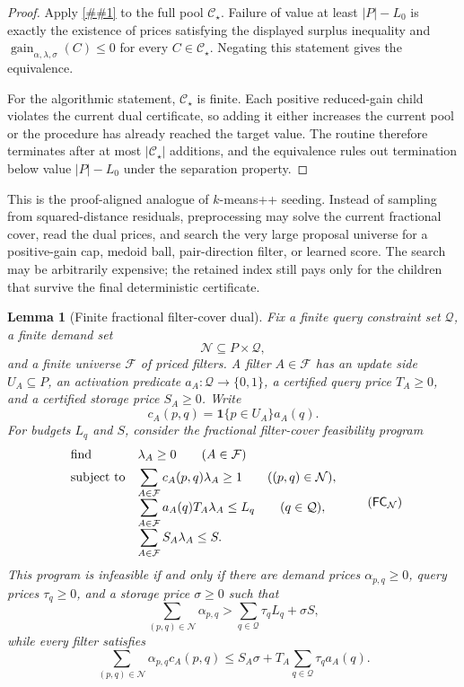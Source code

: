 \documentclass[10pt]{article}
\newcommand{\cref}[1]{\ref{##1}}
\newtheorem{lemma}[theorem]{Lemma}
\theoremstyle{definition}
\begin{document}
\begin{proof}
   Apply \cref{lem:finite-pool-dual} to the full pool
   $\mathcal C_\star$.  Failure of value at least $|P|-L_0$ is exactly the
   existence of prices satisfying the displayed surplus inequality and
   \(\operatorname{gain}_{\alpha,\lambda,\sigma}(C)\le0\) for every
   $C\in\mathcal C_\star$.  Negating this statement gives the equivalence.

   For the algorithmic statement, $\mathcal C_\star$ is finite.  Each positive
   reduced-gain child violates the current dual certificate, so adding it either
   increases the current pool or the procedure has already reached the target
   value.  The routine therefore terminates after at most $|\mathcal C_\star|$
   additions, and the equivalence rules out termination below value
   $|P|-L_0$ under the separation property.
\end{proof}

This is the proof-aligned analogue of $k$-means++ seeding.  Instead of sampling
from squared-distance residuals, preprocessing may solve the current fractional
cover, read the dual prices, and search the very large proposal universe for a
positive-gain cap, medoid ball, pair-direction filter, or learned score.  The
search may be arbitrarily expensive; the retained index still pays only for the
children that survive the final deterministic certificate.

\begin{lemma}[Finite fractional filter-cover dual]
   \label{lem:finite-filter-cover-dual}
   Fix a finite query constraint set $\mathcal Q$, a finite demand set
   \[
      \mathcal N\subseteq P\times\mathcal Q,
   \]
   and a finite universe $\mathcal F$ of priced filters.  A filter
   $A\in\mathcal F$ has an update side $U_A\subseteq P$, an activation predicate
   $a_A:\mathcal Q\to\{0,1\}$, a certified query price $T_A\ge0$, and a
   certified storage price $S_A\ge0$.  Write
   \[
      c_A(p,q)=\mathbf 1\{p\in U_A\}a_A(q).
   \]
   For budgets $L_q$ and $S$, consider the fractional filter-cover feasibility
   program
   \[
   \begin{array}{ll}
   \text{\rm find} & \lambda_A\ge0 \qquad(A\in\mathcal F)\\[0.4em]
   \text{\rm subject to}
      & \displaystyle
        \sum_{A\in\mathcal F}c_A(p,q)\lambda_A\ge1
        \qquad ((p,q)\in\mathcal N),\\[0.8em]
      & \displaystyle
        \sum_{A\in\mathcal F}a_A(q)T_A\lambda_A\le L_q
        \qquad(q\in\mathcal Q),\\[0.8em]
      & \displaystyle
        \sum_{A\in\mathcal F}S_A\lambda_A\le S .
   \end{array}
   \tag{$\mathsf{FC}_{\mathcal N}$}
   \]
   This program is infeasible if and only if there are demand prices
   $\alpha_{p,q}\ge0$, query prices $\tau_q\ge0$, and a storage price
   $\sigma\ge0$ such that
   \[
      \sum_{(p,q)\in\mathcal N}\alpha_{p,q}
      >
      \sum_{q\in\mathcal Q}\tau_qL_q+\sigma S,
      \tag{FC-D1}
   \]
   while every filter satisfies
   \[
      \sum_{(p,q)\in\mathcal N}\alpha_{p,q}c_A(p,q)
      \le
      S_A\sigma+T_A\sum_{q\in\mathcal Q}\tau_qa_A(q).
      \tag{FC-D2}
   \]
\end{lemma}
\end{document}
